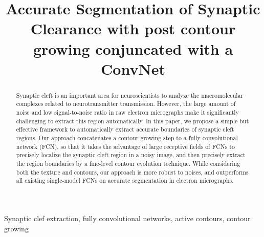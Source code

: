 \documentclass{article}
\newcommand{\comments}[1]{}
\begin{document}
\sloppy

\def\x{{\mathbf x}}
\def\L{{\cal L}}


\title{Accurate Segmentation of Synaptic Clearance with post contour growing conjuncated with a ConvNet}
%
\address{}


\maketitle


%
\begin{abstract}

Synaptic cleft is an important area for neuroscientists to analyze the macromolecular complexes related to neurotransmitter transmission.
However, the large amount of noise and low signal-to-noise ratio in raw electron micrographs make it significantly challenging to extract this region automatically.
%
In this paper, we propose a simple but effective framework to automatically extract accurate boundaries of synaptic cleft regions.
Our approach concatenates a contour growing step to a fully convolutional network (FCN), so that it takes the advantage of large receptive fields of FCNs to precisely localize the synaptic cleft region in a noisy image, and then precisely extract the region boundaries by a fine-level contour evolution technique.
%
While considering both the texture and contours, our approach is more robust to noises, and outperforms all existing single-model FCNs on accurate segmentation in electron micrographs.

\comments{
In this paper, we proposed a novel contour extraction algorithm combined with a fully convolutional network to localize the accurate synaptic cleft region in such highly noisy images.
%
Starting with an initial segmentation form a fully convolutional network, our contour extraction algorithm first finds out an initial piece of contour from the pre-segmentation, and then grows it to localize the whole synaptic cleft region.
Different from previous region-based techniques or dense prediction networks, our model focuses on localizing the exact contours rather than the internal texture, which is more robust to noises in electron micrographs.
Experiments demonstrate the effectiveness and superiority of our proposed method on segmenting the target regions in electron micrographs.
}
\end{abstract}
%
\begin{keywords}
Synaptic clef extraction, fully convolutional networks, active contours, contour growing
\end{keywords}
%




\end{document}
